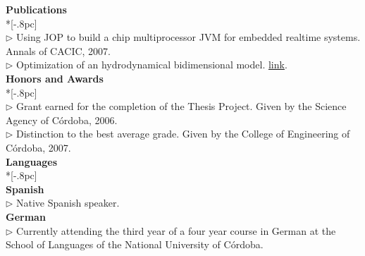 \documentclass[a4paper,11pt,english]{article}
\begin{document}
\newpage
{\bf Publications} \\*[-.8pc]
\underline{\hspace{6in}} \\
$\triangleright$ Using JOP to build a chip multiprocessor JVM for embedded realtime systems. Annals of CACIC, 2007.\\
$\triangleright$ Optimization of an hydrodynamical bidimensional model. \href{http://www.cimec.org.ar/ojs/index.php/mc/article/viewFile/2930/2867}{link}. \\


{\bf Honors and Awards} \\*[-.8pc]
\underline{\hspace{6in}} \\
$\triangleright$ Grant earned for the completion of the Thesis Project.
Given by the Science Agency of C\'ordoba, 2006.\\ 
$\triangleright$ Distinction to the best average grade.
Given by the College of Engineering of C\'ordoba, 2007.\\
\newline
{\large \bf Languages} \\*[-.8pc]
\underline{\hspace{6in}} \\
{\bf Spanish}\\
$\triangleright$ Native Spanish speaker.
\\
{\bf German}\\
$\triangleright$ Currently attending the third year of a four year course in German 
at the School of Languages of the National University of C\'ordoba.
 \\
\end{document}
